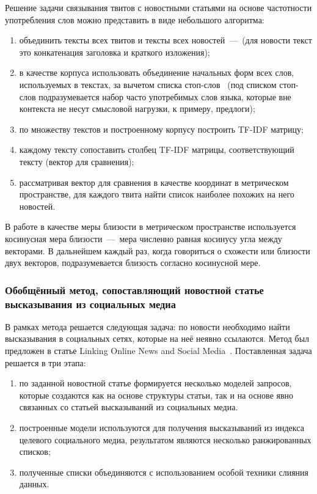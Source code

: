         Решение задачи связывания твитов с новостными статьями на основе частотности употребления слов можно представить в виде небольшого алгоритма:
        \begin{enumerate}
            \item объединить тексты всех твитов и тексты всех новостей~---~(для новости текст это конкатенация заголовка и краткого изложения);
            \item в качестве корпуса использовать объединение начальных форм всех слов, используемых в текстах, за вычетом списка стоп-слов~
            (под списком стоп-слов подразумевается набор часто употребимых слов языка, которые вне контекста не несут смысловой нагрузки, к примеру, предлоги);
            \item по множеству текстов и построенному корпусу построить TF-IDF матрицу;
            \item каждому тексту сопоставить столбец TF-IDF матрицы, соответствующий тексту (вектор для сравнения);
            \item рассматривая вектор для сравнения в качестве координат в метрическом пространстве, для каждого твита найти список наиболее похожих на него новостей.
        \end{enumerate}

        В работе в качестве меры близости в метрическом пространстве используется косинусная мера близости~---~мера численно равная косинусу угла между векторами.
        В дальнейшем каждый раз, когда говориться о схожести или близости двух векторов, подразумевается близость согласно косинусной мере.

    \subsubsection{Обобщённый метод, сопоставляющий новостной статье высказывания из социальных медиа}
        В рамках метода решается следующая задача: по новости необходимо найти высказывания в социальных сетях, которые на неё неявно ссылаются.
        Метод был предложен в статье Linking Online News and Social Media~\cite{linking_news_media}.
        Поставленная задача решается в три этапа:
        \begin{enumerate}
            \item по заданной новостной статье формируется несколько моделей запросов, которые создаются как на основе структуры статьи,
                так и на основе явно связанных со статьей высказываний из социальных медиа.
            \item построенные модели используются для получения высказываний из индекса целевого социального медиа, результатом являются несколько ранжированных списков;
            \item полученные списки объединяются с использованием особой техники слияния данных.
        \end{enumerate}

